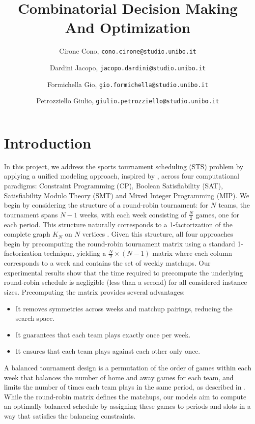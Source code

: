 \documentclass{article}
\title{Combinatorial Decision Making And Optimization}
\author{
  Cirone Cono, \texttt{cono.cirone@studio.unibo.it}
  \and
  Dardini Jacopo, \texttt{jacopo.dardini@studio.unibo.it}
  \and
  Formichella Gio, \texttt{gio.formichella@studio.unibo.it}
  \and
  Petrozziello Giulio, \texttt{giulio.petrozziello@studio.unibo.it} 
}
\date{}
\begin{document}
\maketitle


\section{Introduction}
In this project, we address the sports tournament scheduling (STS) problem by applying a unified modeling approach, inspired by \cite{10.1007/10704567_6}, across four computational paradigms: Constraint Programming (CP), Boolean Satisfiability (SAT), Satisfiability Modulo Theory (SMT) and Mixed Integer Programming (MIP).
We begin by considering the structure of a round-robin tournament: for $N$ teams, the tournament spans $N-1$ weeks, with each week consisting of $\frac{N}{2}$ games, one for each period. This structure naturally corresponds to a 1-factorization of the complete graph $K_N$ on $N$ vertices \cite{Dinitz2006RoundRobin}. Given this structure, all four approaches begin by precomputing the round-robin tournament matrix using a standard 1-factorization technique, yielding a $\frac{N}{2} \times (N-1)$ matrix where each column corresponds to a week and contains the set of weekly matchups. Our experimental results show that the time required to precompute the underlying round-robin schedule is negligible (less than a second) for all considered instance sizes. Precomputing the matrix provides several advantages:

\begin{itemize}
  \item It removes symmetries across weeks and matchup pairings, reducing the search space.
  \item It guarantees that each team plays exactly once per week.
  \item It ensures that each team plays against each other only once.
\end{itemize}
A balanced tournament design is a permutation of the order of games within each week that balances the number of home and away games for each team, and limits the number of times each team plays in the same period, as described in \cite{Lamken2006BalancedTournamentDesigns}. While the round-robin matrix defines the matchups, our models aim to compute an optimally balanced schedule by assigning these games to periods and slots in a way that satisfies the balancing constraints.
\end{document}

